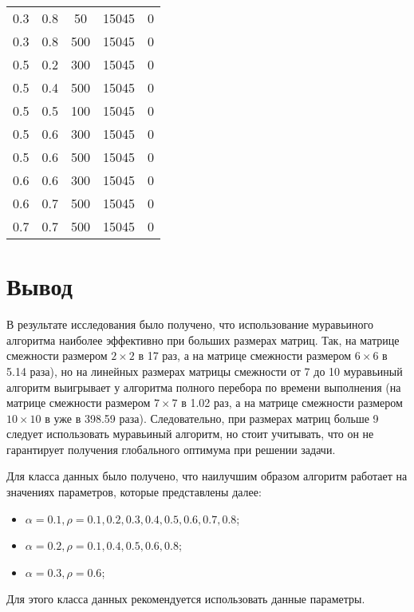 \begin{table}[ht]
\begin{center}
\begin{threeparttable}
\begin{tabular}{|c|c|c|c|c|}
				0.3 &  0.8 &   50 & 15045 &     0 \\
				0.3 &  0.8 &  500 & 15045 &     0 \\ \hline
				0.5 &  0.2 &  300 & 15045 &     0 \\
				0.5 &  0.4 &  500 & 15045 &     0 \\
				0.5 &  0.5 &  100 & 15045 &     0 \\
				0.5 &  0.6 &  300 & 15045 &     0 \\
				0.5 &  0.6 &  500 & 15045 &     0 \\ \hline
				0.6 &  0.6 &  300 & 15045 &     0 \\
				0.6 &  0.7 &  500 & 15045 &     0 \\ \hline
				0.7 &  0.7 &  500 & 15045 &     0 \\ \hline
			\end{tabular}	
		\end{threeparttable}
	\end{center}
\end{table}

\clearpage

\section*{Вывод}

В результате исследования было получено, что использование муравьиного алгоритма наиболее эффективно при больших размерах матриц. 
Так, на матрице смежности размером $2\times2$ в 17 раз, а на матрице смежности размером $6\times6$ в 5.14 раза), но на линейных размерах матрицы смежности от 7 до 10 муравьиный алгоритм выигрывает у алгоритма полного перебора по времени выполнения (на матрице смежности размером $7\times7$ в 1.02 раз, а на матрице смежности размером $10\times10$ в уже в 398.59 раза).
Следовательно, при размерах матриц больше 9 следует использовать муравьиный алгоритм, но стоит учитывать, что он не гарантирует получения глобального оптимума при решении задачи.

Для класса данных было получено, что наилучшим образом алгоритм работает на значениях параметров, которые представлены далее:

\begin{itemize}[label=---]
	\item $\alpha = 0.1, \rho = 0.1, 0.2, 0.3, 0.4, 0.5, 0.6, 0.7, 0.8$;
	\item $\alpha = 0.2, \rho = 0.1, 0.4, 0.5, 0.6, 0.8$;
	\item $\alpha = 0.3, \rho = 0.6$;
\end{itemize} 

Для этого класса данных рекомендуется использовать данные параметры.

